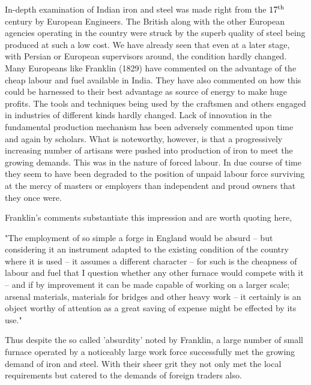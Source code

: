 In-depth examination of Indian iron and steel was made right from the $17^{\rm th}$ century by European Engineers. The British along with the other European agencies operating in the country were struck by the superb quality of steel being produced at such a low cost. We have already seen that even at a later stage, with Persian or European supervisors around, the condition hardly changed. Many Europeans like Franklin (1829) have commented on the advantage of the cheap labour and fuel available in India. They have also commented on how this could be harnessed to their best advantage as source of energy to make huge profits. The tools and techniques being used by the craftsmen and others engaged in industries of different kinds hardly changed. Lack of innovation in the fundamental production mechanism has been adversely commented upon time and again by scholars. What is noteworthy, however, is that a progressively increasing number of artisans were pushed into production of iron to meet the growing demands. This was in the nature of forced labour. In due course of time they seem to have been degraded to the position of unpaid labour force surviving at the mercy of masters or employers than independent and proud owners that they once were.

Franklin's comments substantiate this impression and are worth quoting here,

 "The employment of so simple a forge in England would be absurd – but considering it an instrument adapted to the existing condition of the country where it is used – it assumes a different character – for such is the cheapness of labour and fuel that I question whether any other furnace would compete with it – and if by improvement it can be made capable of working on a larger scale; arsenal materials, materials for bridges and other heavy work – it certainly is an object worthy of attention as a great saving of expense might be effected by its use." 

Thus despite the so called 'absurdity' noted by Franklin, a large number of small furnace operated by a noticeably large work force successfully met the growing demand of iron and steel. With their sheer grit they not only met the local requirements but catered to the demands of foreign traders also.

